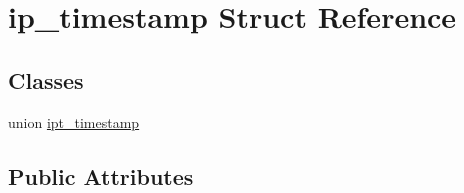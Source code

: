 \hypertarget{structip__timestamp}{
\section{ip\_\-timestamp Struct Reference}
\label{structip__timestamp}
}
\subsection*{Classes}
\begin{DoxyCompactItemize}
\item 
union \hyperlink{unionip__timestamp_1_1ipt__timestamp}{ipt\_\-timestamp}
\end{DoxyCompactItemize}
\subsection*{Public Attributes}
